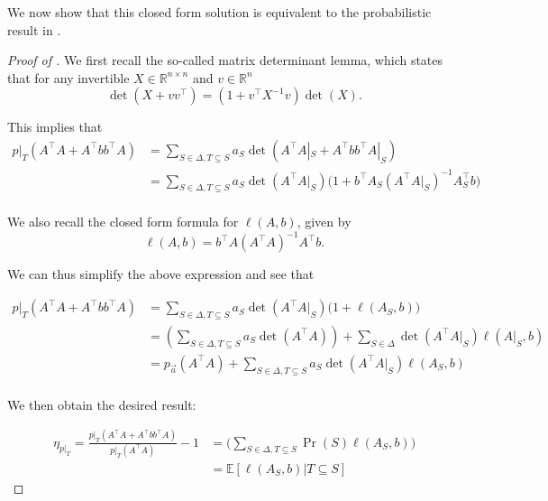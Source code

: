 \documentclass{amsart}
\theoremstyle{definition}
\newcommand{\R}{\mathbb{R}}
\newcommand{\EE}{\mathbb{E}}
\begin{document}
We now show that this closed form solution is equivalent to the probabilistic result in .
\begin{proof}[Proof of ]
    We first recall the so-called matrix determinant lemma, which states that for any invertible $X \in \R^{n\times n }$ and $v \in \R^{n}$
    \[
        \det(X + vv^{\intercal}) = (1+v^{\intercal}X^{-1}v)\det(X).
    \]

    This implies that
    \begin{align*}
        p|_{T}(A^{\intercal}A + A^{\intercal}bb^{\intercal}A) &= \sum_{S \in \Delta, T \subseteq S} a_S\det(A^{\intercal}A|_S + A^{\intercal}bb^{\intercal}A|_S)\\
                                                                   &= \sum_{S \in \Delta, T \subseteq S} a_S\det(A^{\intercal}A|_S)\big(1+b^{\intercal}A_S(A^{\intercal}A|_S)^{-1}A_S^{\intercal}b\big)\\
    \end{align*}

    We also recall the closed form formula for $\ell(A,b)$, given by
    \[
        \ell(A,b) = b^{\intercal}A(A^{\intercal}A)^{-1}A^{\intercal}b.
    \]

    We can thus simplify the above expression and see that

    \begin{align*}
        p|_{T}(A^{\intercal}A + A^{\intercal}bb^{\intercal}A) &= \sum_{S \in \Delta, T \subseteq S} a_S\det(A^{\intercal}A|_S)\big(1+\ell(A_S,b)\big)\\
                                                                   &= \left( \sum_{S \in \Delta, T \subseteq S} a_S\det(A^{\intercal}A) \right) + \sum_{S \in \Delta}\det(A^{\intercal}A|_S)\ell(A|_S,b)\\
                                                                   &= p_{\vec{a}}(A^{\intercal}A) + \sum_{S \in \Delta, T \subseteq S}a_S\det(A^{\intercal}A|_S)\ell(A_S,b)\\
    \end{align*}

    We then obtain the desired result:

    \begin{align*}
        \eta_{p|_T} = \frac{p|_{T}(A^{\intercal}A + A^{\intercal}bb^{\intercal}A)}{p|_{T}(A^{\intercal}A)} - 1 &= \big(\sum_{S \in \Delta, T \subseteq S}\Pr(S)\ell(A_S,b)\big)\\
                                                                                                      &= \EE[\ell(A_S, b) | T \subseteq S]
    \end{align*}
\end{proof}
\end{document}
